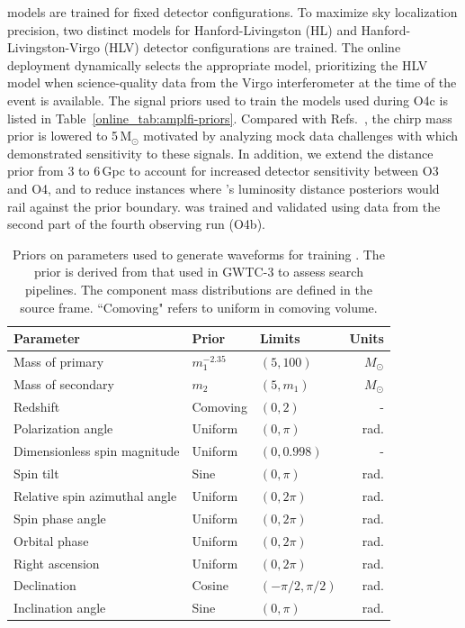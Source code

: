 \begin{refsection}
\amplfi models are trained for fixed detector configurations. 
To maximize sky localization precision, two distinct \amplfi models for Hanford-Livingston (HL) and Hanford-Livingston-Virgo (HLV) detector configurations are trained. 
The online deployment dynamically selects the appropriate model, prioritizing the HLV model when science-quality data from the Virgo interferometer at the time of the event is available. 
The signal priors used to train the \amplfi models used during O4c is listed in Table~\ref{online_tab:amplfi-priors}. 
Compared with Refs.~\cite{amplfi, Marx:2025ioo}, the chirp mass prior is lowered to 5\,$\mathrm{M}_{\odot}$ motivated by analyzing mock data challenges with \aframe which demonstrated sensitivity to these signals. 
In addition, we extend the distance prior from 3 to 6\,Gpc to account for increased detector sensitivity between O3 and O4, and to reduce instances where \amplfi's luminosity distance posteriors would rail against the prior boundary. 
\amplfi was trained and validated using data from the second part of the fourth observing run (O4b).

\begin{table}
\centering
\begin{tabular}{ lllr }
\hline
\hline
Parameter & Prior & Limits & Units\\
\hline
Mass of primary & $m_1^{-2.35}$ & $(5, 100)$ & $M_{\odot}$\\
Mass of secondary & $m_2$ & $(5, m_1)$ & $M_{\odot}$\\
Redshift & Comoving & $(0, 2)$ & -\\
Polarization angle & Uniform & $(0, \pi)$ & rad.\\
Dimensionless spin magnitude & Uniform & $(0, 0.998)$ & -\\
Spin tilt & Sine & $(0, \pi)$ & rad.\\
Relative spin azimuthal angle & Uniform & $(0, 2\pi)$ & rad.\\
Spin phase angle & Uniform & $(0, 2\pi)$ & rad.\\
Orbital phase & Uniform & $(0, 2\pi)$ & rad.\\
Right ascension & Uniform & $(0, 2\pi)$ & rad.\\
Declination &Cosine & $(-\pi/2, \pi/2)$ & rad.\\
Inclination angle & Sine & $(0, \pi)$ & rad.\\
\hline
\hline
\end{tabular}
\caption[Training priors for the online \aframe model]{Priors on parameters used to generate waveforms for training \aframe. 
The prior is derived from that used in GWTC-3 to assess search pipelines. 
The component mass distributions are defined in the source frame. 
``Comoving" refers to uniform in comoving volume.}
\label{online_tab:aframe-priors}
\end{table}


\end{refsection}
